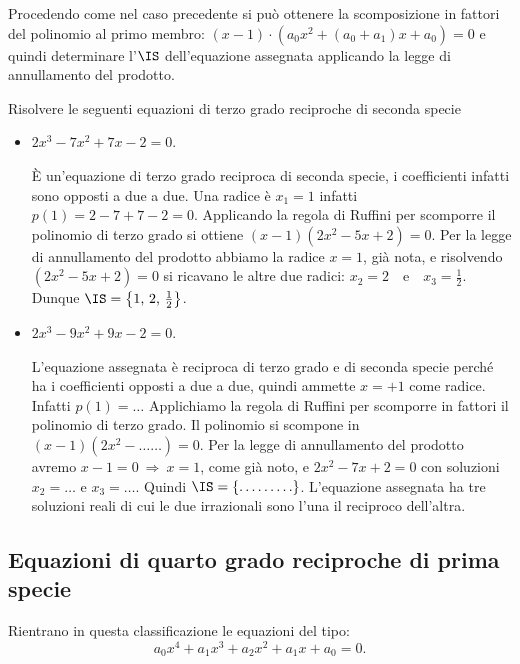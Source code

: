Procedendo come nel caso precedente si può ottenere la scomposizione in fattori del polinomio al primo membro: $(x-1)\cdot \left(a_0x^2+(a_0+a_1)x+a_0\right)=0$ e quindi determinare l'$\IS$ dell'equazione assegnata applicando la legge di annullamento del prodotto.
\begin{exrig}
 \begin{esempio}
 Risolvere le seguenti equazioni di terzo grado reciproche di seconda specie

 \begin{itemize}
 \item $ 2x^3-7x^2+7x-2=0 $.

 \`E un'equazione di terzo grado reciproca di seconda specie, i coefficienti infatti sono opposti a due a due. Una radice è $x_1=1$ infatti $p(1)=2-7+7-2=0$. Applicando la regola di Ruffini per scomporre il polinomio di terzo grado si ottiene $(x-1)\left(2x^2-5x+2\right)=0$. Per la legge di annullamento del prodotto abbiamo la radice $x=1$, già nota, e risolvendo $\left(2x^2-5x+2\right)=0$ si ricavano le altre due radici: $x_2=2$~~e~~$x_3=\frac 1 2$. Dunque $\IS=\left\{1\text{, }2\text{, }\frac 1 2\right\}$.

 \item $ 2x^3-9x^2+9x-2=0 $.

 L'equazione assegnata è reciproca di terzo grado e di seconda specie perché ha i coefficienti opposti a due a due, quindi ammette $x=+1$ come radice. Infatti $p(1)=\ldots$
 Applichiamo la regola di Ruffini per scomporre in fattori il polinomio di terzo grado. Il polinomio si scompone in $(x-1)\left(2x^2- \ldots \ldots\right)=0$. Per la legge di annullamento del prodotto avremo $x-1=0\:\Rightarrow\: x=1$, come già noto, e $2x^2-7x+2=0$ con soluzioni $x_2=\ldots $ e $x_3=\ldots $. Quindi $\IS=\{\ldots \ldots \ldots \}$. L'equazione assegnata ha tre soluzioni reali di cui le due irrazionali sono l'una il reciproco dell'altra.
 \end{itemize}
 \end{esempio}
\end{exrig}
\ovalbox{\risolvii \ref{ese:5.42}, \ref{ese:5.43}, \ref{ese:5.44}}

\subsection{Equazioni di quarto grado reciproche di prima specie}

Rientrano in questa classificazione le equazioni del tipo: \[a_0x^4+a_1x^3+a_2x^2+a_1x+a_0=0.\]

